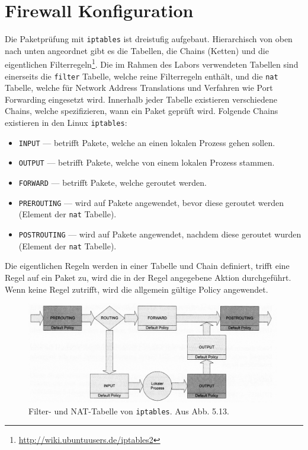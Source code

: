 \section{Firewall Konfiguration}

\newcommand{\lstfwa}[2]{

}

\newcommand{\lstfwb}[2]{

}

Die Paketprüfung mit {\tt iptables} ist dreistufig aufgebaut.
Hierarchisch von oben nach unten angeordnet gibt es die Tabellen, die Chains
(Ketten) und die eigentlichen Filterregeln\footnote{
\url{http://wiki.ubuntuusers.de/iptables2}
}.
Die im Rahmen des Labors verwendeten Tabellen sind einerseits die {\tt filter}
Tabelle, welche reine Filterregeln enthält, und die {\tt nat} Tabelle, welche
für Network Address Translations und Verfahren wie Port Forwarding eingesetzt
wird.
Innerhalb jeder Tabelle existieren verschiedene Chains, welche spezifizieren,
wann ein Paket geprüft wird.
Folgende Chains existieren in den Linux {\tt iptables}:

\begin{itemize}
\item {\tt INPUT} --- betrifft Pakete, welche an einen lokalen Prozess gehen
      sollen.
\item {\tt OUTPUT} --- betrifft Pakete, welche von einem lokalen Prozess stammen.
\item {\tt FORWARD} --- betrifft Pakete, welche geroutet werden.
\item {\tt PREROUTING} --- wird auf Pakete angewendet, bevor diese geroutet
      werden (Element der {\tt nat} Tabelle).
\item {\tt POSTROUTING} --- wird auf Pakete angewendet, nachdem diese geroutet
      wurden (Element der {\tt nat} Tabelle).
\end{itemize}

\noindent Die eigentlichen Regeln werden in einer Tabelle und Chain definiert,
trifft eine Regel auf ein Paket zu, wird die in der Regel angegebene Aktion
durchgeführt.
Wenn keine Regel zutrifft, wird die allgemein gültige Policy angewendet.

\begin{figure}[h!]
  \centering
    \includegraphics[width=0.99\textwidth]{figures/iptables-filter-nat.png}
  \caption{Filter- und NAT-Tabelle von {\tt iptables}. Aus \cite{iptables} Abb. 5.13.}
  \label{fig.iptables-filter-nat}
\end{figure}

